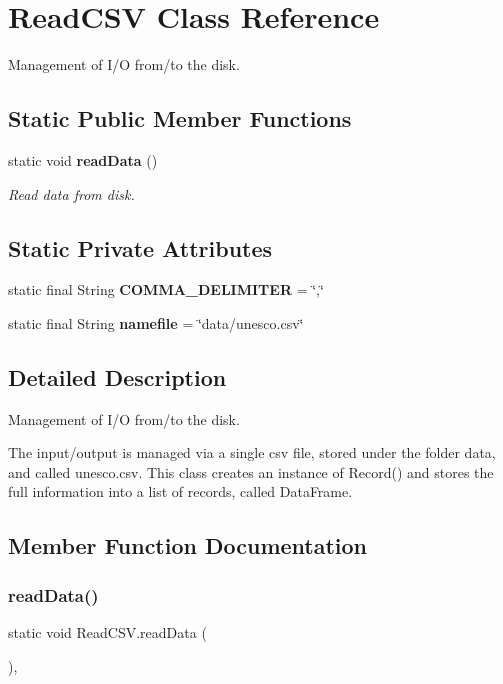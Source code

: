 \section{Read\+C\+SV Class Reference}
\label{classReadCSV}


Management of I/O from/to the disk.  


\subsection*{Static Public Member Functions}
\begin{DoxyCompactItemize}
\item 
static void \textbf{ read\+Data} ()
\begin{DoxyCompactList}\small\item\em Read data from disk. \end{DoxyCompactList}\end{DoxyCompactItemize}
\subsection*{Static Private Attributes}
\begin{DoxyCompactItemize}
\item 
static final String \textbf{ C\+O\+M\+M\+A\+\_\+\+D\+E\+L\+I\+M\+I\+T\+ER} = \char`\"{},\char`\"{}
\item 
static final String \textbf{ namefile} = \char`\"{}data/unesco.\+csv\char`\"{}
\end{DoxyCompactItemize}


\subsection{Detailed Description}
Management of I/O from/to the disk. 

The input/output is managed via a single csv file, stored under the folder data, and called {\ttfamily unesco.\+csv}. This class creates an instance of Record() and stores the full information into a list of records, called Data\+Frame. 

\subsection{Member Function Documentation}
\mbox{\label{classReadCSV_a4983c6a36d171f35c441b8fe8a6fd8be}} 
\subsubsection{read\+Data()}
{\footnotesize\ttfamily static void Read\+C\+S\+V.\+read\+Data (\begin{DoxyParamCaption}{ }\end{DoxyParamCaption})\hspace{0.3cm}{\ttfamily [inline]}, {\ttfamily [static]}}



